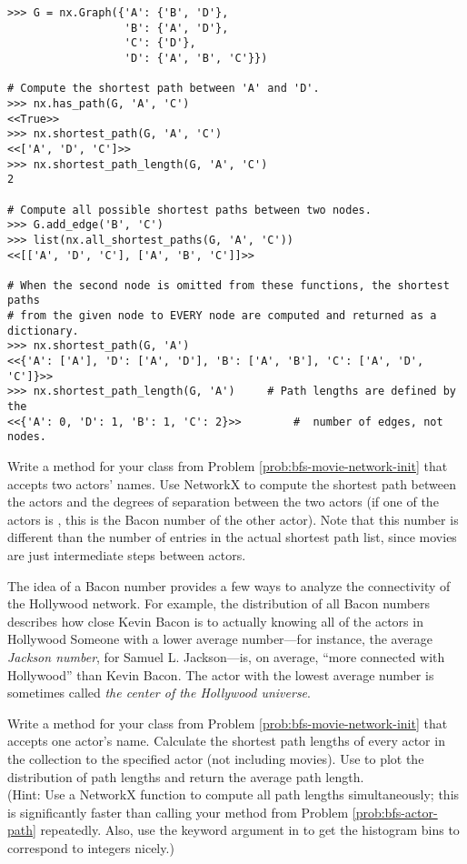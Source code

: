 \begin{lstlisting}
>>> G = nx.Graph({'A': {'B', 'D'},
                  'B': {'A', 'D'},
                  'C': {'D'},
                  'D': {'A', 'B', 'C'}})

# Compute the shortest path between 'A' and 'D'.
>>> nx.has_path(G, 'A', 'C')
<<True>>
>>> nx.shortest_path(G, 'A', 'C')
<<['A', 'D', 'C']>>
>>> nx.shortest_path_length(G, 'A', 'C')
2

# Compute all possible shortest paths between two nodes.
>>> G.add_edge('B', 'C')
>>> list(nx.all_shortest_paths(G, 'A', 'C'))
<<[['A', 'D', 'C'], ['A', 'B', 'C']]>>

# When the second node is omitted from these functions, the shortest paths
# from the given node to EVERY node are computed and returned as a dictionary.
>>> nx.shortest_path(G, 'A')
<<{'A': ['A'], 'D': ['A', 'D'], 'B': ['A', 'B'], 'C': ['A', 'D', 'C']}>>
>>> nx.shortest_path_length(G, 'A')     # Path lengths are defined by the
<<{'A': 0, 'D': 1, 'B': 1, 'C': 2}>>        #  number of edges, not nodes.
\end{lstlisting}

\begin{problem} %
Write a method for your class from Problem \ref{prob:bfs-movie-network-init} that accepts two actors' names.
Use NetworkX to compute the shortest path between the actors and the degrees of separation between the two actors (if one of the actors is , this is the Bacon number of the other actor).
Note that this number is different than the number of entries in the actual shortest path list, since movies are just intermediate steps between actors.
\label{prob:bfs-actor-path}
\end{problem}

The idea of a Bacon number provides a few ways to analyze the connectivity of the Hollywood network.
For example, the distribution of all Bacon numbers describes how close Kevin Bacon is to actually knowing all of the actors in Hollywood
Someone with a lower average number---for instance, the average \emph{Jackson number}, for Samuel L. Jackson---is, on average, ``more connected with Hollywood'' than Kevin Bacon.
The actor with the lowest average number is sometimes called \emph{the center of the Hollywood universe}.

\begin{problem} %
\label{prob:bfs-average-bacon-number}
Write a method for your class from Problem \ref{prob:bfs-movie-network-init} that accepts one actor's name.
Calculate the shortest path lengths of every actor in the collection to the specified actor (not including movies).
Use  to plot the distribution of path lengths and return the average path length.
\\(Hint: Use a NetworkX function to compute all path lengths simultaneously; this is significantly faster than calling your method from Problem \ref{prob:bfs-actor-path} repeatedly.
Also, use the keyword argument  in  to get the histogram bins to correspond to integers nicely.)
\end{problem}

